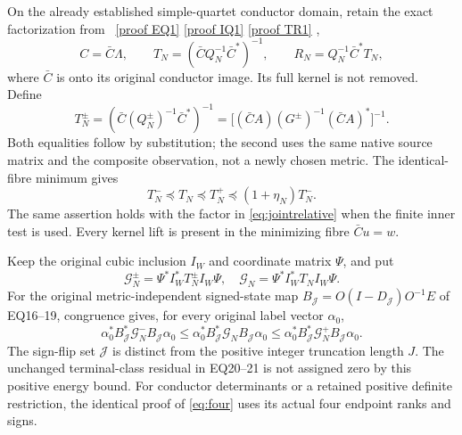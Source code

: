 \documentclass[11pt]{article}
\begin{document}
On the already established simple-quartet conductor domain, retain
the exact factorization from \cite{EQ,TR}%
~\href{https://github.com/KokunoYumeto/zeta-function-research-reader/blob/5992ad50c0f2a06921f1fcaded7b4e38097c0739/workbenches/splitzero-tandem/continuations/20260920-original-kernel-mixed-determinants/providers/original_minimum/EIGHT_STATE_ORIGINAL_MINIMUM.tex\#L61}{[proof EQ1]} \href{https://github.com/KokunoYumeto/zeta-function-research-reader/blob/5992ad50c0f2a06921f1fcaded7b4e38097c0739/workbenches/splitzero-tandem/continuations/20260920-original-kernel-mixed-determinants/providers/original_minimum/independent/EIGHT_STATE_QUOTIENT_REDERIVATION.tex\#L26}{[proof IQ1]} \href{https://github.com/KokunoYumeto/zeta-function-research-reader/blob/5992ad50c0f2a06921f1fcaded7b4e38097c0739/workbenches/splitzero-tandem/continuations/20260920-original-kernel-mixed-determinants/providers/NATIVE_TRUNCATION_CONDUCTOR_RETURN.tex\#L54}{[proof TR1]}%
{},
\[
 C=\bar C\Lambda,
 \qquad T_N=(\bar C Q_N^{-1}\bar C^*)^{-1},
 \qquad R_N=Q_N^{-1}\bar C^*T_N,
\]
where $\bar C$ is onto its original conductor image.  Its full
kernel is not removed.  Define
\begin{equation}\label{eq:conductor}
 T_N^\pm=(\bar C(Q_N^\pm)^{-1}\bar C^*)^{-1}
 =\bigl[(\bar CA)(G^\pm)^{-1}(\bar CA)^*\bigr]^{-1}.
\end{equation}
Both equalities follow by substitution; the second uses the same
native source matrix and the composite observation, not a newly
chosen metric.  The identical-fibre minimum gives
\[
 T_N^-\preceq T_N\preceq T_N^+
 \preceq(1+\eta_N)T_N^-.
\]
The same assertion holds with the factor in \eqref{eq:jointrelative}
when the finite inner test is used.  Every kernel lift is present in
the minimizing fibre $\bar Cu=w$.

Keep the original cubic inclusion $I_W$ and coordinate matrix $\Psi$,
and put
\[
 \mathcal G_N^\pm=\Psi^*I_W^*T_N^\pm I_W\Psi,
 \quad\mathcal G_N=\Psi^*I_W^*T_NI_W\Psi.
\]
For the original metric-independent signed-state map
$B_{\mathcal J}=O(I-D_{\mathcal J})O^{-1}E$ of EQ16--19, congruence
gives, for every original label vector $\alpha_0$,
\begin{equation}\label{eq:defect}
 \alpha_0^*B_{\mathcal J}^*\mathcal G_N^-B_{\mathcal J}\alpha_0
 \le\alpha_0^*B_{\mathcal J}^*\mathcal G_NB_{\mathcal J}\alpha_0
 \le\alpha_0^*B_{\mathcal J}^*\mathcal G_N^+B_{\mathcal J}\alpha_0.
\end{equation}
The sign-flip set $\mathcal J$ is distinct from the positive integer
truncation length $J$.  The unchanged terminal-class residual in
EQ20--21 is not assigned zero by this positive energy bound.  For
conductor determinants or a retained positive definite restriction,
the identical proof of \eqref{eq:four} uses its actual four endpoint
ranks and signs.
\end{document}
